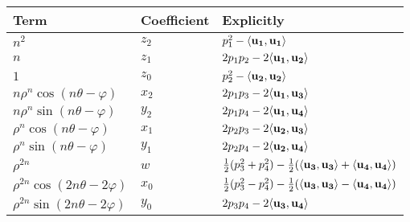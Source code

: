 \begin{table}[H]
\begin{tabular}{|l|l|l|}
  \hline
   \textbf{Term}& \textbf{Coefficient}& {\bf Explicitly} \\
  \hline
  $n^2$ & $z_2$ & $p_1^2 - \langle\mathbf{u_1}, \mathbf{u_1}\rangle$ \\
   \hline
  $n$ & $z_1$ & $2p_1p_2 - 2\langle\mathbf{u_1}, \mathbf{u_2}\rangle$ \\
   \hline
   $1$ & $z_0$ & $p_2^2 - \langle\mathbf{u_2}, \mathbf{u_2}\rangle $ \\
  \hline
  $n\rho^n\cos (n\theta - \varphi)$ & $x_2$ & $2p_1p_3 - 2\langle\mathbf{u_1}, \mathbf{u_3}\rangle$ \\
   \hline
  $n\rho^n\sin (n\theta - \varphi)$ & $y_2$ & $2p_1p_4 - 2\langle\mathbf{u_1}, \mathbf{u_4}\rangle$ \\
   \hline
   $\rho^n\cos (n\theta-\varphi)$ & $x_1$ & $2p_2p_3 - 2\langle\mathbf{u_2}, \mathbf{u_3}\rangle$ \\
   \hline
  $\rho^n\sin (n\theta-\varphi)$ & $y_1$ & $2p_2p_4 - 2\langle\mathbf{u_2}, \mathbf{u_4}\rangle$ \\
   \hline
   $\rho^{2n}$ & $w$ & $\frac{1}{2}(p_3^2 + p_4^2) - \frac{1}{2}
 (\langle\mathbf{u_3}, \mathbf{u_3}\rangle + \langle\mathbf{u_4}, \mathbf{u_4}\rangle)$ \\
  \hline
  $\rho^{2n}\cos (2n\theta - 2\varphi)$ & $x_0$ & $\frac{1}{2}(p_3^2 - p_4^2) - \frac{1}{2}(\langle\mathbf{u_3}, \mathbf{u_3}\rangle - \langle\mathbf{u_4}, \mathbf{u_4}\rangle)$ \\
   \hline
  $\rho^{2n}\sin (2n\theta - 2\varphi)$ & $y_0$ & $2p_3p_4 - 2\langle\mathbf{u_3}, \mathbf{u_4}\rangle$ \\
  \hline
\end{tabular}
\end{table}

